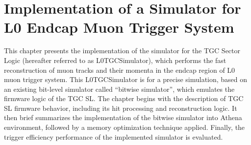 \chapter{Implementation of a Simulator for L0 Endcap Muon Trigger System} \label{ch:L0MuonS1TGC}
This chapter presents the implementation of the simulator for the TGC Sector Logic (hereafter referred to as L0TGCSimulator), which performs the fast reconstruction of muon tracks and their momenta in the endcap region of L0 muon trigger system. This L0TGCSimulator is for a precise simulation, based on an existing bit-level simulator called ``bitwise simulator'', which emulates the firmware logic of the TGC SL. The chapter begins with the description of TGC SL firmware behavior, including its hit processing and reconstruction logic. It then brief summarizes the implementation of the bitwise simulator into Athena environment, followed by a memory optimization technique applied. Finally, the trigger efficiency performance of the implemented simulator is evaluated.
